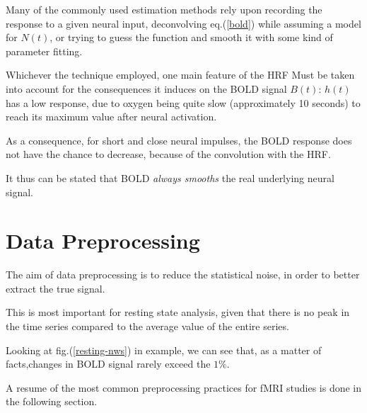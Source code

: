 \documentclass[12pt,openright,twoside,a4paper]{book}
\begin{document}
Many of the commonly used estimation methods rely upon recording the response to a given neural input, deconvolving eq.(\ref{bold}) while assuming a model for $N(t)$, or trying to guess the function and smooth it with some kind of parameter fitting.
\vspace{5mm}

Whichever the technique employed, one main feature of the HRF Must be taken into account for the consequences it induces on the BOLD signal $B(t)$: $h(t)$ has a low response, due to oxygen being quite slow (approximately 10 seconds) to reach its maximum value after neural activation.

As a consequence, for short and close neural impulses, the BOLD response does not have the chance to decrease, because of the convolution with the HRF. 

It thus can be stated that BOLD \textit{always smooths} the real underlying neural signal.

\section{Data Preprocessing}

The aim of data preprocessing is to reduce the statistical noise, in order to better extract the true signal.

This is most important for resting state analysis, given that there is no peak in the time series compared to the average value of the entire series. 

Looking at fig.(\ref{resting-nws}) in example, we can see that, as a matter of facts,changes in BOLD signal rarely exceed the $1\%$.
\vspace{5mm}

A resume of the most common preprocessing practices for fMRI studies is done in the following section.
\vspace{5mm}
\end{document}
